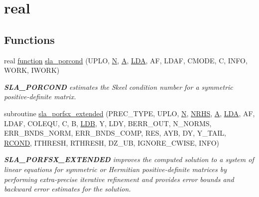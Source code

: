 \hypertarget{group__realPOcomputational}{}\section{real}
\label{group__realPOcomputational}
\subsection*{Functions}
\begin{DoxyCompactItemize}
\item 
real \hyperlink{afunc_8m_a7b5e596df91eadea6c537c0825e894a7}{function} \hyperlink{group__realPOcomputational_ga8480336dc884c4ec105e02d94875c80c}{sla\+\_\+porcond} (U\+P\+L\+O, \hyperlink{polmisc_8c_a0240ac851181b84ac374872dc5434ee4}{N}, \hyperlink{classA}{A}, \hyperlink{example__user_8c_ae946da542ce0db94dced19b2ecefd1aa}{L\+D\+A}, A\+F, L\+D\+A\+F, C\+M\+O\+D\+E, C, I\+N\+F\+O, W\+O\+R\+K, I\+W\+O\+R\+K)
\begin{DoxyCompactList}\small\item\em {\bfseries S\+L\+A\+\_\+\+P\+O\+R\+C\+O\+N\+D} estimates the Skeel condition number for a symmetric positive-\/definite matrix. \end{DoxyCompactList}\item 
subroutine \hyperlink{group__realPOcomputational_ga618e9312cb5cdbed5d64d6c0b1fa26b1}{sla\+\_\+porfsx\+\_\+extended} (P\+R\+E\+C\+\_\+\+T\+Y\+P\+E, U\+P\+L\+O, \hyperlink{polmisc_8c_a0240ac851181b84ac374872dc5434ee4}{N}, \hyperlink{example__user_8c_aa0138da002ce2a90360df2f521eb3198}{N\+R\+H\+S}, \hyperlink{classA}{A}, \hyperlink{example__user_8c_ae946da542ce0db94dced19b2ecefd1aa}{L\+D\+A}, A\+F, L\+D\+A\+F, C\+O\+L\+E\+Q\+U, C, B, \hyperlink{example__user_8c_a50e90a7104df172b5a89a06c47fcca04}{L\+D\+B}, Y, L\+D\+Y, B\+E\+R\+R\+\_\+\+O\+U\+T, N\+\_\+\+N\+O\+R\+M\+S, E\+R\+R\+\_\+\+B\+N\+D\+S\+\_\+\+N\+O\+R\+M, E\+R\+R\+\_\+\+B\+N\+D\+S\+\_\+\+C\+O\+M\+P, R\+E\+S, A\+Y\+B, D\+Y, Y\+\_\+\+T\+A\+I\+L, \hyperlink{superlu__enum__consts_8h_af00a42ecad444bbda75cde1b64bd7e72a9b5c151728d8512307565994c89919d5}{R\+C\+O\+N\+D}, I\+T\+H\+R\+E\+S\+H, R\+T\+H\+R\+E\+S\+H, D\+Z\+\_\+\+U\+B, I\+G\+N\+O\+R\+E\+\_\+\+C\+W\+I\+S\+E, I\+N\+F\+O)
\begin{DoxyCompactList}\small\item\em {\bfseries S\+L\+A\+\_\+\+P\+O\+R\+F\+S\+X\+\_\+\+E\+X\+T\+E\+N\+D\+E\+D} improves the computed solution to a system of linear equations for symmetric or Hermitian positive-\/definite matrices by performing extra-\/precise iterative refinement and provides error bounds and backward error estimates for the solution. \end{DoxyCompactList}\item 

\end{DoxyCompactItemize}
